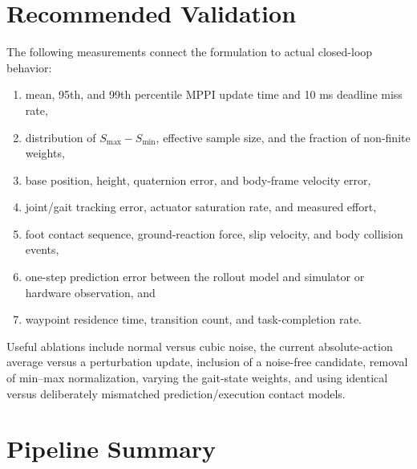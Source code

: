 \documentclass[11pt,a4paper]{article}
\begin{document}
\section{Recommended Validation}

The following measurements connect the formulation to actual closed-loop
behavior:
\begin{enumerate}
  \item mean, 95th, and 99th percentile MPPI update time and 10 ms deadline
        miss rate,
  \item distribution of $S_{\max}-S_{\min}$, effective sample size, and the
        fraction of non-finite weights,
  \item base position, height, quaternion error, and body-frame velocity error,
  \item joint/gait tracking error, actuator saturation rate, and measured
        effort,
  \item foot contact sequence, ground-reaction force, slip velocity, and body
        collision events,
  \item one-step prediction error between the rollout model and simulator or
        hardware observation, and
  \item waypoint residence time, transition count, and task-completion rate.
\end{enumerate}

Useful ablations include normal versus cubic noise, the current absolute-action
average versus a perturbation update, inclusion of a noise-free candidate,
removal of min--max normalization, varying the gait-state weights, and using
identical versus deliberately mismatched prediction/execution contact models.

\section{Pipeline Summary}
\end{document}

